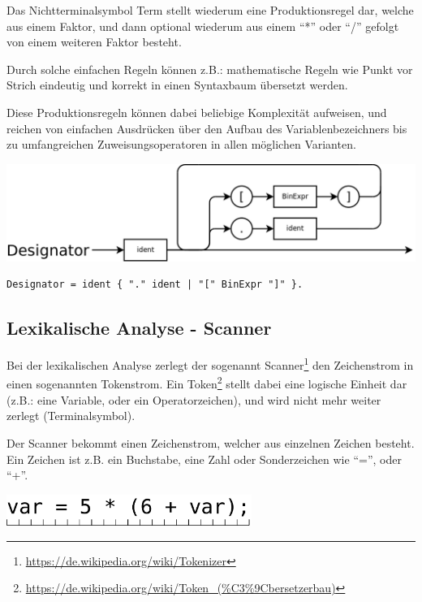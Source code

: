 Das Nichtterminalsymbol Term stellt wiederum eine Produktionsregel dar, welche aus einem Faktor, und dann optional wiederum aus einem ``*'' oder ``/'' gefolgt von einem weiteren Faktor besteht.

Durch solche einfachen Regeln können z.B.: mathematische Regeln wie Punkt vor Strich eindeutig und korrekt in einen Syntaxbaum übersetzt werden.

Diese Produktionsregeln k\"onnen dabei beliebige Komplexit\"at aufweisen, und reichen von einfachen Ausdr\"ucken \"uber den Aufbau des Variablenbezeichners bis zu umfangreichen Zuweisungsoperatoren in allen m\"oglichen Varianten.

\includegraphics[width=\textwidth]{./media/images/compiler/ebnf_designator.png}
\begin{lstlisting}[language=EBNF]
Designator = ident { "." ident | "[" BinExpr "]" }.
\end{lstlisting}


\newpage

\subsection{Lexikalische Analyse - Scanner}

Bei der lexikalischen Analyse zerlegt der sogenannt Scanner\footnote{\url{https://de.wikipedia.org/wiki/Tokenizer}} den Zeichenstrom in einen sogenannten Tokenstrom. Ein Token\footnote{\url{https://de.wikipedia.org/wiki/Token_(\%C3\%9Cbersetzerbau)}} stellt dabei eine logische Einheit dar (z.B.: eine Variable, oder ein Operatorzeichen), und wird nicht mehr weiter zerlegt (Terminalsymbol).


Der Scanner bekommt einen Zeichenstrom, welcher aus einzelnen Zeichen besteht. Ein Zeichen ist z.B. ein Buchstabe, eine Zahl oder Sonderzeichen wie ``='', oder ``+''.

\includegraphics[width=0.6\textwidth]{./media/images/compiler/input_characterstream.png}

